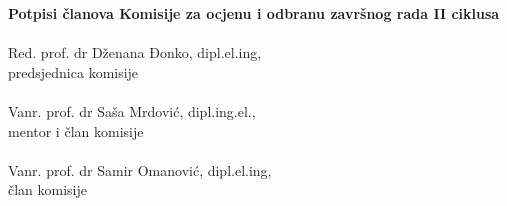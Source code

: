 \pagebreak
\thispagestyle{plain}
\vspace{2cm}
\begin{center}
\textbf{\Large Potpisi članova Komisije za ocjenu i odbranu završnog rada II ciklusa}\\


\vspace{4cm}
\makebox[10cm]{\hrulefill} \\
Red. prof. dr Dženana Đonko, dipl.el.ing, \\
predsjednica komisije\\

\vspace{3cm}
\makebox[10cm]{\hrulefill} \\
Vanr. prof. dr Saša Mrdović, dipl.ing.el., \\
mentor i član komisije\\

\vspace{3cm}
\makebox[10cm]{\hrulefill} \\
Vanr. prof. dr Samir Omanović, dipl.el.ing, \\
član komisije

\end{center}
